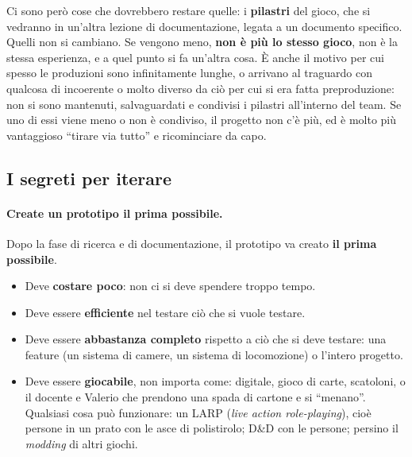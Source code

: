 Ci sono però cose che dovrebbero restare quelle: i \textbf{pilastri} del
gioco, che si vedranno in un'altra lezione di documentazione, legata a un
documento specifico. Quelli non si cambiano. Se vengono meno, \textbf{non è
più lo stesso gioco}, non è la stessa esperienza, e a quel punto si fa
un'altra cosa. È anche il motivo per cui spesso le produzioni sono
infinitamente lunghe, o arrivano al traguardo con qualcosa di incoerente o
molto diverso da ciò per cui si era fatta preproduzione: non si sono
mantenuti, salvaguardati e condivisi i pilastri all'interno del team. Se uno
di essi viene meno o non è condiviso, il progetto non c'è più, ed è molto più
vantaggioso ``tirare via tutto'' e ricominciare da capo.

\subsection{I segreti per iterare}
\label{sec:segreti-iterazione}

\paragraph{Create un prototipo il prima possibile.} Dopo la fase di ricerca
e di documentazione, il prototipo va creato \textbf{il prima possibile}.
\begin{itemize}
  \item Deve \textbf{costare poco}: non ci si deve spendere troppo tempo.
  \item Deve essere \textbf{efficiente} nel testare ciò che si vuole testare.
  \item Deve essere \textbf{abbastanza completo} rispetto a ciò che si deve
        testare: una feature (un sistema di camere, un sistema di
        locomozione) o l'intero progetto.
  \item Deve essere \textbf{giocabile}, non importa come: digitale, gioco di
        carte, scatoloni, o il docente e Valerio che prendono una spada di
        cartone e si ``menano''. Qualsiasi cosa può funzionare: un LARP
        (\emph{live action role-playing}), cioè persone in un prato con le
        asce di polistirolo; D\&D con le persone; persino il \emph{modding} di
        altri giochi.
\end{itemize}

